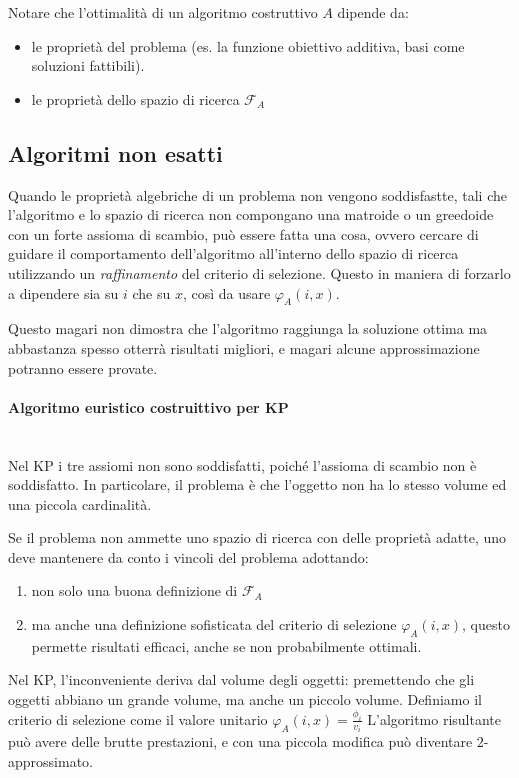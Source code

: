 \documentclass{article}
\begin{document}
    Notare che l'ottimalità di un algoritmo costruttivo $A$ dipende da:
    \begin{itemize}
        \item le proprietà del problema (es. la funzione obiettivo additiva, basi
              come soluzioni fattibili).
        \item le proprietà dello spazio di ricerca $\mathcal{F}_A$
    \end{itemize}

    \subsection{Algoritmi non esatti}

    Quando le proprietà algebriche di un problema non vengono soddisfastte, tali che l'algoritmo e
    lo spazio di ricerca non compongano una matroide o un greedoide con un forte assioma di scambio,
    può essere fatta una cosa, ovvero cercare di guidare il comportamento dell'algoritmo all'interno dello
    spazio di ricerca utilizzando un \textit{raffinamento} del criterio di selezione. Questo in maniera
    di forzarlo a dipendere sia su $i$ che su $x$, così da usare $\varphi_A (i,x)$.

    Questo magari non dimostra che l'algoritmo raggiunga la soluzione ottima ma abbastanza spesso otterrà
    risultati migliori, e magari alcune approssimazione potranno essere provate.

    \paragraph{Algoritmo euristico costruittivo per KP}\mbox{}\\
    Nel KP i tre assiomi non sono soddisfatti, poiché l'assioma di scambio non è soddisfatto.
    In particolare, il problema è che l'oggetto non ha lo stesso volume ed una piccola cardinalità.

    Se il problema non ammette uno spazio di ricerca con delle proprietà adatte, uno deve mantenere
    da conto i vincoli del problema adottando:
    \begin{enumerate}
        \item non solo una buona definizione di $\mathcal{F}_A$
        \item ma anche una definizione sofisticata del criterio di selezione $\varphi_A(i,x)$,
              questo permette risultati efficaci, anche se non probabilmente ottimali.
    \end{enumerate}
    Nel KP, l'inconveniente deriva dal volume degli oggetti: premettendo che gli oggetti abbiano
    un grande volume, ma anche un piccolo volume. Definiamo il criterio di selezione come il
    valore unitario $\varphi_A(i,x)=\frac{\phi_i}{v_i}$
    L'algoritmo risultante può avere delle brutte prestazioni, e con una piccola modifica può diventare
$2$-approssimato.
\end{document}
